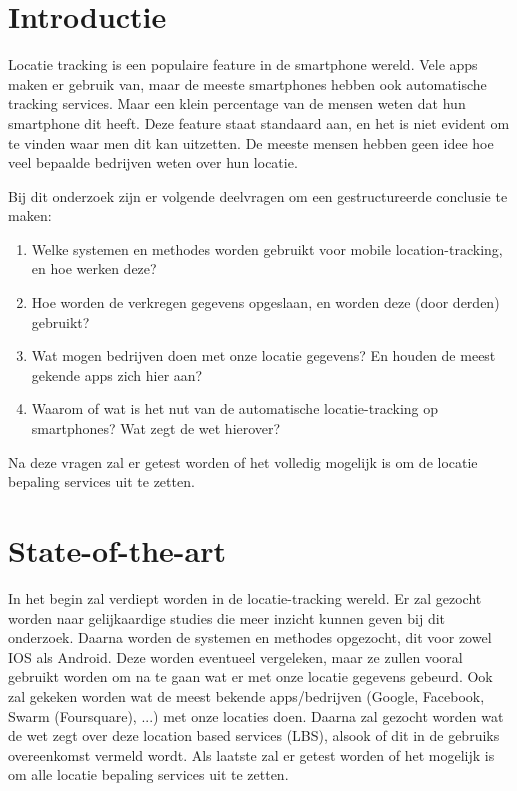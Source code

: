 
\section{Introductie} %
\label{sec:introductie}

Locatie tracking is een populaire feature in de smartphone wereld. Vele apps maken er gebruik van, maar de meeste smartphones hebben ook automatische tracking services. Maar een klein percentage van de mensen weten dat hun smartphone dit heeft. Deze feature staat standaard aan, en het is niet evident om te vinden waar men dit kan uitzetten. De meeste mensen hebben geen idee hoe veel bepaalde bedrijven weten over hun locatie.

Bij dit onderzoek zijn er volgende deelvragen om een gestructureerde conclusie te maken:

\begin{enumerate}
  \item Welke systemen en methodes worden gebruikt voor mobile location-tracking, en hoe werken deze?
  \item Hoe worden de verkregen gegevens opgeslaan, en worden deze (door derden) gebruikt?
  \item Wat mogen bedrijven doen met onze locatie gegevens? En houden de meest gekende apps zich hier aan?
  \item Waarom of wat is het nut van de automatische locatie-tracking op smartphones? Wat zegt de wet hierover?
\end{enumerate}

Na deze vragen zal er getest worden of het volledig mogelijk is om de locatie bepaling services uit te zetten. 


\section{State-of-the-art}
\label{sec:state-of-the-art}

In het begin zal verdiept worden in de locatie-tracking wereld. Er zal gezocht worden naar gelijkaardige studies die meer inzicht kunnen geven bij dit onderzoek. Daarna worden de systemen en methodes opgezocht, dit voor zowel IOS als Android. Deze worden eventueel vergeleken, maar ze zullen vooral gebruikt worden om na te gaan wat er met onze locatie gegevens gebeurd. Ook zal gekeken worden wat de meest bekende apps/bedrijven (Google, Facebook, Swarm (Foursquare), ...) met onze locaties doen.
Daarna zal gezocht worden wat de wet zegt over deze location based services (LBS), alsook of dit in de gebruiks overeenkomst vermeld wordt.
Als laatste zal er getest worden of het mogelijk is om alle locatie bepaling services uit te zetten.

